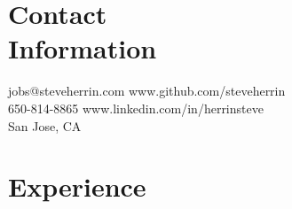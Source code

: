 \documentclass[margin,line]{resume}
\begin{document}
\begin{resume}

    \section{\mysidestyle Contact\\Information}

    jobs@steveherrin.com		\hfill www.github.com/steveherrin		\vspace{0mm}\\\vspace{0mm}%
    650-814-8865				\hfill www.linkedin.com/in/herrinsteve		\vspace{0mm}\\\vspace{-4.5mm}%
    San Jose, CA    				\hfill		\vspace{0mm}\\\vspace{0mm}%

    \section{\mysidestyle Experience}


\end{resume}
\end{document}
